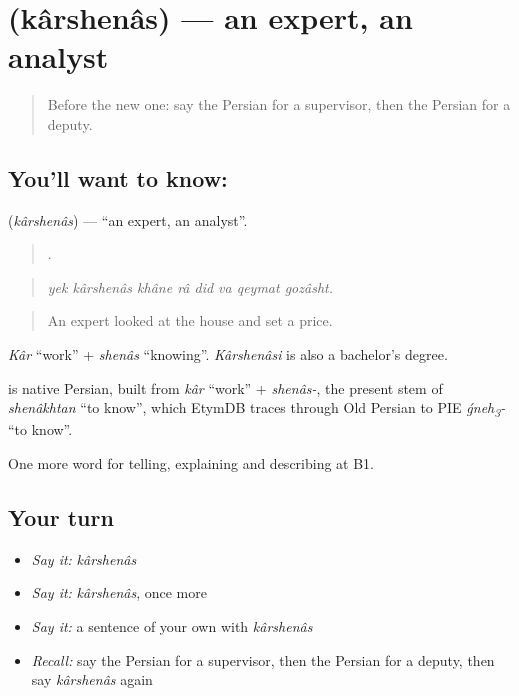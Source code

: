 \section[\texorpdfstring{\fa{کارشناس} (kârshenâs)}{کارشناس (kârshenâs)}]{ (kârshenâs) — an expert, an analyst}

\label{lesson:FA-C381-karshenas}



\begin{quote}
Before the new one: say the Persian for a supervisor, then the Persian for a deputy.
\end{quote}

\subsection*{You'll want to know: }
\textbf{} (\emph{kârshenâs}) — \textquotedblleft{}an expert, an analyst\textquotedblright{}.

\begin{quote}
       .
\end{quote}

\begin{quote}
\emph{yek kârshenâs khâne râ did va qeymat gozâsht.}
\end{quote}

\begin{quote}
An expert looked at the house and set a price.
\end{quote}

\emph{Kâr} \textquotedblleft{}work\textquotedblright{} + \emph{shenâs} \textquotedblleft{}knowing\textquotedblright{}. \emph{Kârshenâsi} is also a bachelor's degree.

\begin{cousinweb}
\textbf{} is native Persian, built from \emph{kâr} \textquotedblleft{}work\textquotedblright{} + \emph{shenâs-}, the present stem of \emph{shenâkhtan} \textquotedblleft{}to know\textquotedblright{}, which EtymDB traces through Old Persian to PIE \emph{ǵneh\textsubscript{3}-} \textquotedblleft{}to know\textquotedblright{}.
\end{cousinweb}

\begin{grammarlens}[title={What you've built}]
One more word for telling, explaining and describing at B1.
\end{grammarlens}

\subsection*{Your turn}
\begin{itemize}
\raggedright
  \item \emph{Say it:} \emph{kârshenâs}
  \item \emph{Say it:} \emph{kârshenâs}, once more
  \item \emph{Say it:} a sentence of your own with \emph{kârshenâs}
  \item \emph{Recall:} say the Persian for a supervisor, then the Persian for a deputy, then say \emph{kârshenâs} again
\end{itemize}

